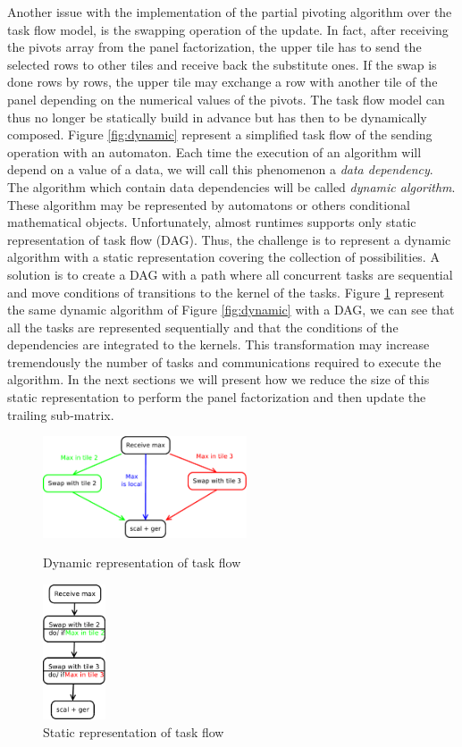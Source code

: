 Another issue with the implementation of the partial pivoting algorithm over the task flow model, is the swapping operation of the update. In fact, after receiving the pivots array from the panel factorization, the upper tile has to send the selected rows to other tiles and receive back the substitute ones. If the swap is done rows by rows, the upper tile may exchange a row with another tile of the panel depending on the numerical values of the pivots. The task flow model can thus no longer be statically build in advance but has then to be dynamically composed. Figure \ref{fig:dynamic} represent a simplified task flow of the sending operation with an automaton. Each time the execution of an algorithm will depend on a value of a data, we will call this phenomenon a \emph{data dependency}. The algorithm which contain data dependencies will be called \emph{dynamic algorithm}. These algorithm may be represented by automatons or others conditional mathematical objects. Unfortunately, almost runtimes supports only static representation of task flow (DAG). Thus, the challenge is to represent a dynamic algorithm with a static representation covering the collection of possibilities. A solution is to create a DAG with a path where all concurrent tasks are sequential and move conditions of transitions to the kernel of the tasks. Figure \ref{fig:static} represent the same dynamic algorithm of Figure \ref{fig:dynamic} with a DAG, we can see that all the tasks are represented sequentially and that the conditions of the dependencies are integrated to the kernels. This transformation may increase tremendously the number of tasks and communications required to execute the algorithm. In the next sections we will present how we reduce the size of this static representation to perform the panel factorization and then update the trailing sub-matrix.

\begin{figure}[!ht]
\begin{minipage}[!ht]{.5\textwidth}
\centering
\includegraphics[height=3cm]{figures/dynamic.pdf}
\caption{Dynamic representation of task flow\label{fig:dynamic}}
\end{minipage} \hfill
\begin{minipage}[!ht]{.5\textwidth}
\centering
\includegraphics[height=4cm]{figures/static.pdf}
\caption{Static representation of task flow\label{fig:static}}
\end{minipage}
\end{figure}
